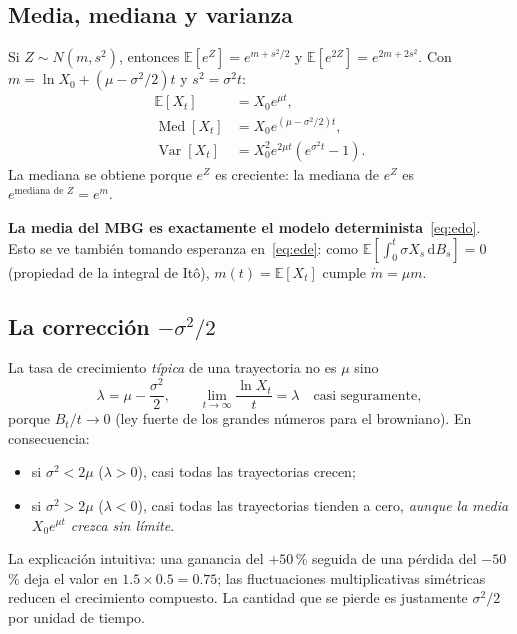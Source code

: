 \documentclass[11pt,a4paper]{article}
\newcommand{\dd}{\mathrm{d}}
\newcommand{\E}{\mathbb{E}}
\newcommand{\Var}{\operatorname{Var}}
\newcommand{\Med}{\operatorname{Med}}
\begin{document}
\subsection{Media, mediana y varianza}

Si $Z \sim N(m, s^2)$, entonces $\E[e^Z] = e^{m + s^2/2}$ y $\E[e^{2Z}] = e^{2m + 2s^2}$. Con $m = \ln X_0 + (\mu - \sigma^2/2)t$ y $s^2 = \sigma^2 t$:
\begin{align}
    \E[X_t]   &= X_0 e^{\mu t}, \label{eq:media}\\
    \Med[X_t] &= X_0 e^{(\mu - \sigma^2/2)t}, \label{eq:mediana}\\
    \Var[X_t] &= X_0^2 e^{2\mu t}\left( e^{\sigma^2 t} - 1 \right). \label{eq:varianza}
\end{align}
La mediana se obtiene porque $e^{Z}$ es creciente: la mediana de $e^Z$ es $e^{\text{mediana de }Z} = e^m$.

\textbf{La media del MBG es exactamente el modelo determinista}~\eqref{eq:edo}. Esto se ve también tomando esperanza en~\eqref{eq:ede}: como $\E\!\left[\int_0^t \sigma X_s\,\dd B_s\right] = 0$ (propiedad de la integral de Itô), $m(t) = \E[X_t]$ cumple $\dot m = \mu m$.

\subsection{\texorpdfstring{La corrección $-\sigma^2/2$}{La corrección -sigma²/2}}

La tasa de crecimiento \emph{típica} de una trayectoria no es $\mu$ sino
\begin{equation}
    \lambda = \mu - \frac{\sigma^2}{2},
    \qquad \lim_{t\to\infty} \frac{\ln X_t}{t} = \lambda \quad \text{casi seguramente},
\end{equation}
porque $B_t/t \to 0$ (ley fuerte de los grandes números para el browniano). En consecuencia:
\begin{itemize}
    \item si $\sigma^2 < 2\mu$ ($\lambda > 0$), casi todas las trayectorias crecen;
    \item si $\sigma^2 > 2\mu$ ($\lambda < 0$), casi todas las trayectorias tienden a cero, \emph{aunque la media $X_0e^{\mu t}$ crezca sin límite}.
\end{itemize}
La explicación intuitiva: una ganancia del $+50$\,\% seguida de una pérdida del $-50$\,\% deja el valor en $1.5 \times 0.5 = 0.75$; las fluctuaciones multiplicativas simétricas reducen el crecimiento compuesto. La cantidad que se pierde es justamente $\sigma^2/2$ por unidad de tiempo.
\end{document}
